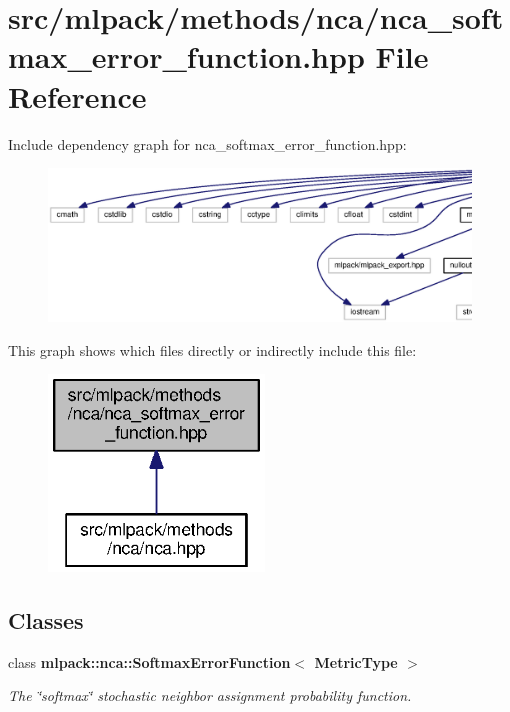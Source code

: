\section{src/mlpack/methods/nca/nca\+\_\+softmax\+\_\+error\+\_\+function.hpp File Reference}
\label{nca__softmax__error__function_8hpp}
Include dependency graph for nca\+\_\+softmax\+\_\+error\+\_\+function.\+hpp\+:
\nopagebreak
\begin{figure}[H]
\begin{center}
\leavevmode
\includegraphics[width=350pt]{nca__softmax__error__function_8hpp__incl}
\end{center}
\end{figure}
This graph shows which files directly or indirectly include this file\+:
\nopagebreak
\begin{figure}[H]
\begin{center}
\leavevmode
\includegraphics[width=163pt]{nca__softmax__error__function_8hpp__dep__incl}
\end{center}
\end{figure}
\subsection*{Classes}
\begin{DoxyCompactItemize}
\item 
class {\bf mlpack\+::nca\+::\+Softmax\+Error\+Function$<$ Metric\+Type $>$}
\begin{DoxyCompactList}\small\item\em The \char`\"{}softmax\char`\"{} stochastic neighbor assignment probability function. \end{DoxyCompactList}\end{DoxyCompactItemize}
